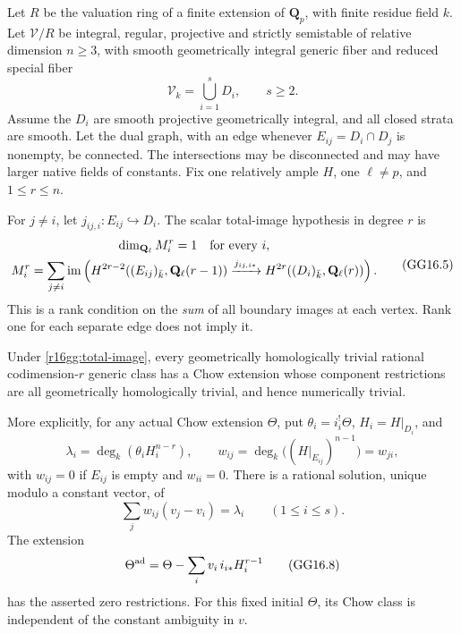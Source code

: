 \begin{definition}
\label{r16gg:definition}
Let $R$ be the valuation ring of a finite extension of $\mathbf Q_p$,
with finite residue field $k$. Let $\mathcal V/R$ be integral,
regular, projective and strictly semistable of relative dimension
$n\geq3$, with smooth geometrically integral generic fiber and
reduced special fiber
\[
                         \mathcal V_k=\bigcup_{i=1}^{s}D_i,
                              \qquad s\geq2.
\]
Assume the $D_i$ are smooth projective geometrically integral,
and all closed strata are smooth. Let the dual graph, with
an edge whenever $E_{ij}=D_i\cap D_j$ is nonempty, be connected.
The intersections may be disconnected and may have larger
native fields of constants. Fix one relatively ample $H$,
one $\ell\ne p$, and $1\leq r\leq n$.

For $j\ne i$, let $j_{ij,i}:E_{ij}\hookrightarrow D_i$.
The scalar total-image hypothesis in degree $r$ is
\[
 \begin{gathered}
 \dim_{\mathbf Q_\ell}M_i^r=1\quad\hbox{for every }i,
 \\
 M_i^r=\sum_{j\ne i}\operatorname{im}\left(
 H^{2r-2}((E_{ij})_{\bar k},\mathbf Q_\ell(r-1))
 \xrightarrow{j_{ij,i*}}
 H^{2r}((D_i)_{\bar k},\mathbf Q_\ell(r))\right).
 \end{gathered}
 \tag{GG16.5}\label{r16gg:total-image}
\]
This is a rank condition on the \emph{sum} of all boundary images
at each vertex. Rank one for each separate edge does not imply it.
\end{definition}

\begin{theorem}
\label{r16gg:correction}
Under \eqref{r16gg:total-image}, every geometrically homologically
trivial rational codimension-$r$ generic class has a Chow extension
whose component restrictions are all geometrically homologically
trivial, and hence numerically trivial.

More explicitly, for any actual Chow extension $\Theta$, put
$\theta_i=i_i^!\Theta$, $H_i=H|_{D_i}$, and
\[
 \lambda_i=\deg_k(\theta_iH_i^{n-r}),\qquad
 w_{ij}=\deg_k\bigl((H|_{E_{ij}})^{n-1}\bigr)=w_{ji},
 \tag{GG16.6}\label{r16gg:weights}
\]
with $w_{ij}=0$ if $E_{ij}$ is empty and $w_{ii}=0$.
There is a rational solution, unique modulo a constant vector, of
\[
                  \sum_jw_{ij}(v_j-v_i)=\lambda_i
                  \qquad(1\leq i\leq s).
 \tag{GG16.7}\label{r16gg:laplacian}
\]
The extension
\[
                 \Theta^{\rm ad}
                    =\Theta-\sum_i v_i\,i_{i*}H_i^{r-1}
 \tag{GG16.8}\label{r16gg:extension}
\]
has the asserted zero restrictions. For this fixed initial
$\Theta$, its Chow class is independent of the constant
ambiguity in $v$.
\end{theorem}

